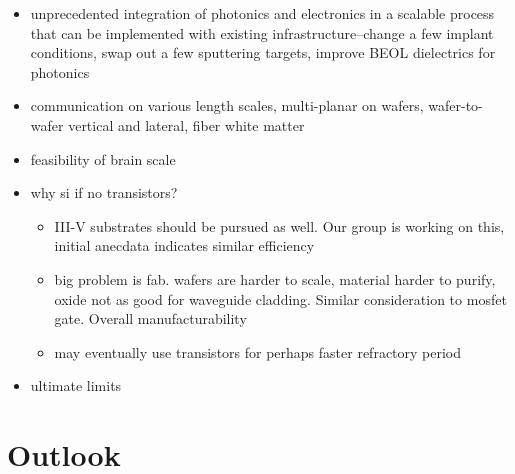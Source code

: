 \documentclass[twocolumn]{article}
\begin{document}
\begin{itemize}
\item unprecedented integration of photonics and electronics in a scalable process that can be implemented with existing infrastructure--change a few implant conditions, swap out a few sputtering targets, improve BEOL dielectrics for photonics
\item communication on various length scales, multi-planar on wafers, wafer-to-wafer vertical and lateral, fiber white matter
\item feasibility of brain scale
\item why si if no transistors?
\begin{itemize}
\item III-V substrates should be pursued as well. Our group is working on this, initial anecdata indicates similar efficiency
\item big problem is fab. wafers are harder to scale, material harder to purify, oxide not as good for waveguide cladding. Similar consideration to mosfet gate. Overall manufacturability
\item may eventually use transistors for perhaps faster refractory period
\end{itemize}
\item ultimate limits
\end{itemize}

\section{\label{sec:outlook}Outlook}
\end{document}
